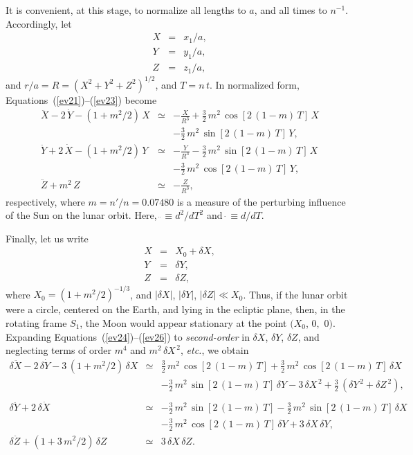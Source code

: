  It is convenient, at this stage, to normalize all lengths to $a$, and all times to $n^{-1}$. Accordingly, let 
 \begin{eqnarray}
 X&=&x_1/a,\label{evxxx}\\[0.5ex] 
 Y&=&y_1/a,\\[0.5ex]
 Z&=&z_1/a, \label{evzzz}
 \end{eqnarray}
 and $r/a=R=(X^2+Y^2+Z^2)^{1/2}$, and $T = n\,t$.
 In  normalized form, Equations~(\ref{ev21})--(\ref{ev23}) become
 \begin{eqnarray}\label{ev24}
 \ddot{X} -2\,\dot{Y}-(1+m^2/2)\,X&\simeq&-\frac{X}{R^3}+\frac{3}{2}\,m^{2}\,\cos[2\,(1-m)\,T]\,X\nonumber\\[0.5ex]
 &&-\frac{3}{2}\,m^{2}\,
 \sin[2\,(1-m)\,T]\,Y,\\[0.5ex]
 \ddot{Y}+2\,\dot{X}-(1+m^2/2)\,Y&\simeq&-\frac{Y}{R^3}-\frac{3}{2}\,m^{2}\,\sin[2\,(1-m)\,T]\,X\nonumber\\[0.5ex]
 &&-\frac{3}{2}\,m^{2}\,
 \cos[2\,(1-m)\,T]\,Y,\\[0.5ex]
 \ddot{Z} + m^2\,Z &\simeq& -\frac{Z}{R^3},\label{ev26}
 \end{eqnarray}
 respectively, 
 where $m=n'/n=0.07480$ is a measure of the perturbing influence of the Sun on the lunar orbit. Here, $\ddot{~}\equiv
 d^2/dT^2$ and $\dot{~}\equiv d/dT$. 
 
 Finally, let us write
 \begin{eqnarray}\label{ev27}
 X &=& X_0 + \delta X,\\[0.5ex]
Y &=& \delta Y,\\[0.5ex]
Z &=& \delta Z,\label{ev29}
 \end{eqnarray}
 where $X_0=(1+m^2/2)^{-1/3}$, and $|\delta X|$, $|\delta Y|$, $|\delta Z|\ll X_0$. Thus, if the lunar orbit were a circle,
 centered on the Earth, and lying in the ecliptic plane,
 then, in the rotating frame $S_1$, the Moon would appear stationary at the point $(X_0$, $0,$ $0)$. 
 Expanding Equations~(\ref{ev24})--(\ref{ev26}) to {\em second-order}\/ in $\delta X$, $\delta Y$,
  $\delta Z$, and neglecting terms of order $m^4$ and $m^2\,\delta X^{\,2}$, {\em etc.}, we obtain
 \begin{eqnarray}\label{ev30}
 \delta \ddot{X}-2\,\delta \dot{Y} - 3\,(1+m^2/2)\,\delta X &\simeq& \frac{3}{2}\,m^2\,\cos[2\,(1-m)\,T]+\frac{3}{2}\,m^2\,\cos[2\,(1-m)\,T]\,\delta X\nonumber\\[0.5ex]
 &&-\frac{3}{2}\,m^2\,\sin[2\,(1-m)\,T]\,\delta Y-3\,\delta X^{\,2} + \frac{3}{2}\,(\delta Y^{\,2} + \delta Z^{\,2}),\nonumber\\[0.5ex]&&\\[0.5ex]
 \delta \ddot{Y}+2\,\delta \dot{X} &\simeq& -\frac{3}{2}\,m^2\,\sin[2\,(1-m)\,T]-\frac{3}{2}\,m^2\,\sin[2\,(1-m)\,T]\,\delta X
\nonumber\\[0.5ex]
 &&-\frac{3}{2}\,m^2\,\cos[2\,(1-m)\,T]\,\delta Y +3\,\delta X\,\delta Y,\\[0.5ex]
 \delta\ddot{Z} + (1+3\,m^2/2)\,\delta Z &\simeq & 3\,\delta X\,\delta Z.\label{ev32}
 \end{eqnarray}
 
